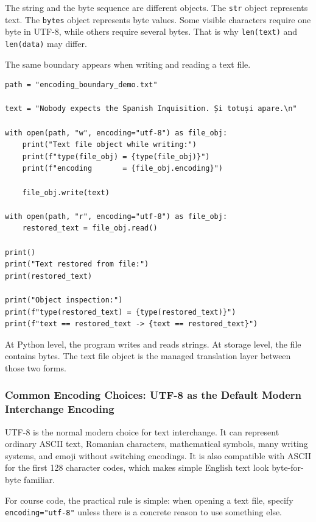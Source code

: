The string and the byte sequence are different objects. The \texttt{str} object represents text. The \texttt{bytes} object represents byte values. Some visible characters require one byte in UTF-8, while others require several bytes. That is why \texttt{len(text)} and \texttt{len(data)} may differ.

The same boundary appears when writing and reading a text file.

\begin{verbatim}
path = "encoding_boundary_demo.txt"

text = "Nobody expects the Spanish Inquisition. Și totuși apare.\n"

with open(path, "w", encoding="utf-8") as file_obj:
    print("Text file object while writing:")
    print(f"type(file_obj) = {type(file_obj)}")
    print(f"encoding       = {file_obj.encoding}")

    file_obj.write(text)

with open(path, "r", encoding="utf-8") as file_obj:
    restored_text = file_obj.read()

print()
print("Text restored from file:")
print(restored_text)

print("Object inspection:")
print(f"type(restored_text) = {type(restored_text)}")
print(f"text == restored_text -> {text == restored_text}")
\end{verbatim}

At Python level, the program writes and reads strings. At storage level, the file contains bytes. The text file object is the managed translation layer between those two forms.

\subsubsection{Common Encoding Choices: UTF-8 as the Default Modern Interchange Encoding}

UTF-8 is the normal modern choice for text interchange. It can represent ordinary ASCII text, Romanian characters, mathematical symbols, many writing systems, and emoji without switching encodings. It is also compatible with ASCII for the first 128 character codes, which makes simple English text look byte-for-byte familiar.

For course code, the practical rule is simple: when opening a text file, specify \texttt{encoding="utf-8"} unless there is a concrete reason to use something else.

